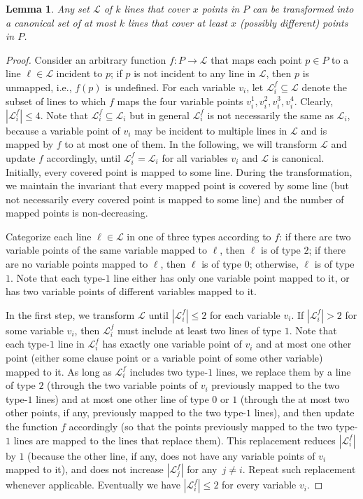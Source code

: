 \documentclass[letterpaper,11pt]{article}
\newtheorem{lemma}{Lemma}
\def\ie{{i.e.}}
\def\L{{\mathcal L}}
\begin{document}
\begin{lemma}\label{lem:canonical}
Any set $\L$ of $k$ lines that cover $x$ points in $P$
can be transformed into a canonical set of at most $k$ lines that
cover at least $x$ (possibly different) points in $P$. 
\end{lemma}
\begin{proof}
Consider an arbitrary function $f:P\to\L$ that maps each point $p \in P$
to a line $\ell \in \L$ incident to $p$;
if $p$ is not incident to any line in $\L$,
then $p$ is unmapped, \ie, $f(p)$ is undefined.
For each variable $v_i$, let $\L_i^f \subseteq \L$ denote the subset of
lines to which $f$ maps the four variable points $v_i^1,v_i^2,v_i^3,v_i^4$.
Clearly, $|\L_i^f| \le 4$.
Note that $\L_i^f \subseteq \L_i$ but in general $\L_i^f$ is not necessarily
the same as $\L_i$, because a variable point of $v_i$ may be incident to
multiple lines in $\L$ and is mapped by $f$ to at most one of them.
In the following, we will transform $\L$ and update $f$ accordingly,
until $\L_i^f = \L_i$ for all variables $v_i$
and $\L$ is canonical.
Initially, every covered point is mapped to some line.
During the transformation, we maintain the invariant that
every mapped point is covered by some line
(but not necessarily every covered point is mapped to some line)
and the number of mapped points is non-decreasing.

Categorize each line $\ell \in \L$ in one of three types according to $f$:
if there are two variable points of the same variable mapped to $\ell$,
then $\ell$ is of type $2$;
if there are no variable points mapped to $\ell$,
then $\ell$ is of type $0$;
otherwise, $\ell$ is of type $1$.
Note that each type-$1$ line either has only one variable point mapped to it,
or has two variable points of different variables mapped to it.

In the first step,
we transform $\L$ until $|\L_i^f| \le 2$ for each variable $v_i$.
If $|\L_i^f| > 2$ for some variable $v_i$,
then $\L_i^f$ must include at least two lines of type $1$.
Note that each type-$1$ line in $\L_i^f$
has exactly one variable point of $v_i$ and at most one other point
(either some clause point or a variable point of some other variable)
mapped to it.
As long as $\L_i^f$ includes two type-$1$ lines,
we replace them by a line of type $2$
(through the two variable points of $v_i$
previously mapped to the two type-$1$ lines)
and at most one other line of type $0$ or $1$
(through the at most two other points, if any,
previously mapped to the two type-$1$ lines),
and then update the function $f$ accordingly
(so that the points previously mapped to the two type-$1$ lines
are mapped to the lines that replace them).
This replacement reduces $|\L_i^f|$ by $1$
(because the other line, if any, does not have any variable points of $v_i$
mapped to it), and does not increase $|\L_j^f|$ for any~$j \neq i$.
Repeat such replacement whenever applicable.
Eventually we have $|\L_i^f| \le 2$ for every variable $v_i$.


\end{proof}
\end{document}
